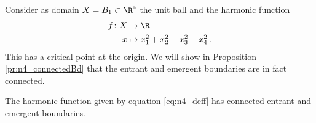 \newpage
\begin{example}[Connected entrant boundary in $d=4$ dimensions]\label{ex:n4}
  Consider as domain $X=B_1\subset\R^4$ the unit ball and
  the harmonic function 
  \begin{equation}
    \begin{aligned}
    f\colon X&\to \R \\
    x &\mapsto x_1^2+x_2^2-x_3^2-x_4^2\,.
    \end{aligned}
    \label{eq:n4_deff}
  \end{equation}
  This has a critical point at the origin.
  We will show in Proposition \ref{pr:n4_connectedBd} that the entrant and emergent boundaries are
  in fact connected.
\end{example}

\begin{proposition}\label{pr:n4_connectedBd}
  The harmonic function given by equation \eqref{eq:n4_deff} has connected entrant and emergent boundaries.
\end{proposition}
